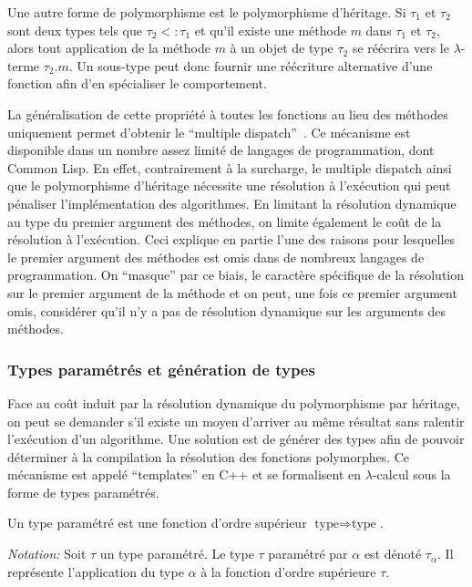 Une autre forme de polymorphisme est le polymorphisme d'héritage. Si
$\tau_1$ et $\tau_2$ sont deux types tels que $\tau_2 <: \tau_1$ et
qu'il existe une méthode $m$ dans $\tau_1$ et $\tau_2$, alors tout
application de la méthode $m$ à un objet de type $\tau_2$ se réécrira
vers le $\lambda$-terme $\tau_2.m$. Un sous-type peut donc fournir une
réécriture alternative d'une fonction afin d'en spécialiser le
comportement.

La généralisation de cette propriété à toutes les fonctions au lieu
des méthodes uniquement permet d'obtenir le ``multiple
dispatch'' \citep{08muschevici}. Ce mécanisme est disponible dans un
nombre assez limité de langages de programmation, dont Common Lisp. En
effet, contrairement à la surcharge, le multiple dispatch ainsi que le
polymorphisme d'héritage nécessite une résolution à l'exécution qui
peut pénaliser l'implémentation des algorithmes. En limitant la
résolution dynamique au type du premier argument des méthodes, on
limite également le coût de la résolution à l'exécution. Ceci explique
en partie l'une des raisons pour lesquelles le premier argument des
méthodes est omis dans de nombreux langages de programmation. On
``masque'' par ce biais, le caractère spécifique de la résolution sur
le premier argument de la méthode et on peut, une fois ce premier
argument omis, considérer qu'il n'y a pas de résolution dynamique sur
les arguments des méthodes.


\subsubsection{Types paramétrés et génération de types}
\label{sec:chap1_model2impl_typage_param}

Face au coût induit par la résolution dynamique du polymorphisme par
héritage, on peut se demander s'il existe un moyen d'arriver au même
résultat sans ralentir l'exécution d'un algorithme. Une solution est
de générer des types afin de pouvoir déterminer à la compilation la
résolution des fonctions polymorphes. Ce mécanisme est appelé
``templates'' en C++ et se formalisent en $\lambda$-calcul sous la
forme de types paramétrés.


\begin{mydef}\label{chap1_parametrized_type}
  Un type paramétré est une fonction d'ordre supérieur $\text{type}
  \Rightarrow \text{type}$.

  \emph{Notation:} Soit $\tau$ un type paramétré. Le type $\tau$
  paramétré par $\alpha$ est dénoté $\tau_\alpha$. Il représente
  l'application du type $\alpha$ à la fonction d'ordre supérieure
  $\tau$.
\end{mydef}


